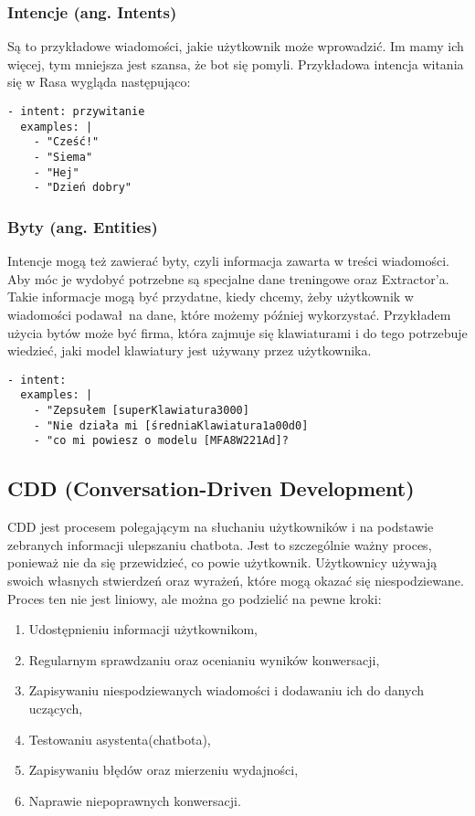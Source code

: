 \documentclass{article}
\begin{document}
\subsubsection{Intencje (ang. Intents)}
Są to przykładowe wiadomości, jakie użytkownik może wprowadzić. Im mamy ich
więcej, tym mniejsza jest szansa, że bot się pomyli. Przykładowa intencja
witania się w Rasa wygląda następująco:

\begin{lstlisting}[caption=Przykładowa intencja]
- intent: przywitanie
  examples: |
    - "Cześć!"
    - "Siema"
    - "Hej"
    - "Dzień dobry"
\end{lstlisting}

\subsubsection{Byty (ang. Entities)}
Intencje mogą też zawierać byty, czyli informacja zawarta w treści wiadomości.
Aby móc je wydobyć potrzebne są specjalne dane treningowe oraz Extractor'a.
Takie informacje mogą być przydatne, kiedy chcemy, żeby użytkownik w wiadomości
podawał na dane, które możemy później wykorzystać. Przykładem użycia bytów może
być firma, która zajmuje się klawiaturami i do tego potrzebuje wiedzieć, jaki
model klawiatury jest używany przez użytkownika.

\begin{lstlisting}[caption=Przykładowa intencja z użyciem bytów]
- intent: 
  examples: |
    - "Zepsułem [superKlawiatura3000]
    - "Nie działa mi [średniaKlawiatura1a00d0]
    - "co mi powiesz o modelu [MFA8W221Ad]?
\end{lstlisting}

\subsection{CDD (Conversation-Driven Development)}
CDD jest procesem polegającym na słuchaniu użytkowników i na podstawie
zebranych informacji ulepszaniu chatbota. Jest to szczególnie ważny proces,
ponieważ nie da się przewidzieć, co powie użytkownik. Użytkownicy używają
swoich własnych stwierdzeń oraz wyrażeń, które mogą okazać się niespodziewane.
Proces ten nie jest liniowy, ale można go podzielić na pewne kroki:
\begin{enumerate}
    \item Udostępnieniu informacji użytkownikom,
    \item Regularnym sprawdzaniu oraz ocenianiu wyników konwersacji,
    \item Zapisywaniu niespodziewanych wiadomości i dodawaniu ich do danych
    uczących,
    \item Testowaniu asystenta(chatbota),
    \item Zapisywaniu błędów oraz mierzeniu wydajności,
    \item Naprawie niepoprawnych konwersacji.
\end{enumerate}
\end{document}
